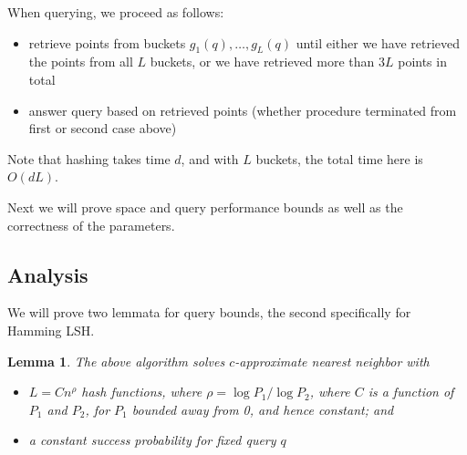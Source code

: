 \documentclass[11pt]{article}
\newtheorem{lemma}[theorem]{Lemma}
\theoremstyle{definition}
\begin{document}
When querying, we proceed as follows:
    \begin{itemize}
        \item retrieve points from buckets $g_1(q), \ldots, g_L(q)$ until either we have retrieved the points from all $L$ buckets, or we have retrieved more than $3L$ points in total
        \item answer query based on retrieved points (whether procedure terminated from first or second case above)
    \end{itemize}

Note that hashing takes time $d$, and with $L$ buckets, the total time here is $O(dL)$.

Next we will prove space and query performance bounds as well as the correctness of the parameters.

\subsection{Analysis}

We will prove two lemmata for query bounds, the second specifically for Hamming LSH.

\begin{lemma}
    The above algorithm solves $c$-approximate nearest neighbor with
    \begin{itemize}
        \item $L = Cn^\rho$ hash functions, where $\rho = \log P_1 / \log P_2$, where $C$ is a function of $P_1$ and $P_2$, for $P_1$ bounded away from 0, and hence constant; and
        \item a constant success probability for fixed query $q$
    \end{itemize}
\end{lemma}
\end{document}
